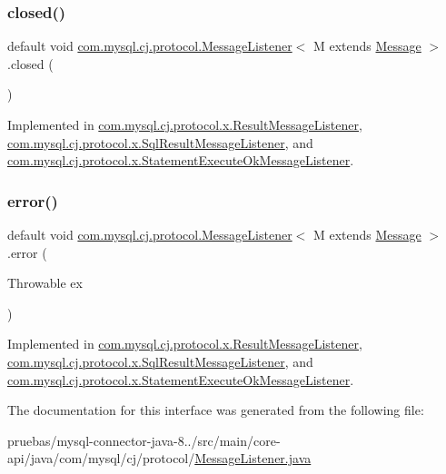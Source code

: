 \subsubsection{\texorpdfstring{closed()}{closed()}}
{\footnotesize\ttfamily default void \mbox{\hyperlink{interfacecom_1_1mysql_1_1cj_1_1protocol_1_1_message_listener}{com.\+mysql.\+cj.\+protocol.\+Message\+Listener}}$<$ M extends \mbox{\hyperlink{interfacecom_1_1mysql_1_1cj_1_1protocol_1_1_message}{Message}} $>$.closed (\begin{DoxyParamCaption}{ }\end{DoxyParamCaption})}



Implemented in \mbox{\hyperlink{classcom_1_1mysql_1_1cj_1_1protocol_1_1x_1_1_result_message_listener_a72527b705b89b553d393412f88615f86}{com.\+mysql.\+cj.\+protocol.\+x.\+Result\+Message\+Listener}}, \mbox{\hyperlink{classcom_1_1mysql_1_1cj_1_1protocol_1_1x_1_1_sql_result_message_listener_a6d9d429bc58631ea5146aca4e841090f}{com.\+mysql.\+cj.\+protocol.\+x.\+Sql\+Result\+Message\+Listener}}, and \mbox{\hyperlink{classcom_1_1mysql_1_1cj_1_1protocol_1_1x_1_1_statement_execute_ok_message_listener_a9451a156729766ae954e065537f03178}{com.\+mysql.\+cj.\+protocol.\+x.\+Statement\+Execute\+Ok\+Message\+Listener}}.

\mbox{\label{interfacecom_1_1mysql_1_1cj_1_1protocol_1_1_message_listener_a9e06f02beaf29eb065149ac4f819761f}} 
\subsubsection{\texorpdfstring{error()}{error()}}
{\footnotesize\ttfamily default void \mbox{\hyperlink{interfacecom_1_1mysql_1_1cj_1_1protocol_1_1_message_listener}{com.\+mysql.\+cj.\+protocol.\+Message\+Listener}}$<$ M extends \mbox{\hyperlink{interfacecom_1_1mysql_1_1cj_1_1protocol_1_1_message}{Message}} $>$.error (\begin{DoxyParamCaption}\item[{Throwable}]{ex }\end{DoxyParamCaption})}



Implemented in \mbox{\hyperlink{classcom_1_1mysql_1_1cj_1_1protocol_1_1x_1_1_result_message_listener_ad8c3856e573b2bcad94f5b914e5f9c82}{com.\+mysql.\+cj.\+protocol.\+x.\+Result\+Message\+Listener}}, \mbox{\hyperlink{classcom_1_1mysql_1_1cj_1_1protocol_1_1x_1_1_sql_result_message_listener_a3ca9df6d049404bea5161c1ac4e3be29}{com.\+mysql.\+cj.\+protocol.\+x.\+Sql\+Result\+Message\+Listener}}, and \mbox{\hyperlink{classcom_1_1mysql_1_1cj_1_1protocol_1_1x_1_1_statement_execute_ok_message_listener_abce681bc363086c23732d92c3fb8bce9}{com.\+mysql.\+cj.\+protocol.\+x.\+Statement\+Execute\+Ok\+Message\+Listener}}.



The documentation for this interface was generated from the following file\+:\begin{DoxyCompactItemize}
\item 
pruebas/mysql-\/connector-\/java-\/8../src/main/core-\/api/java/com/mysql/cj/protocol/\mbox{\hyperlink{_message_listener_8java}{Message\+Listener.\+java}}\end{DoxyCompactItemize}
